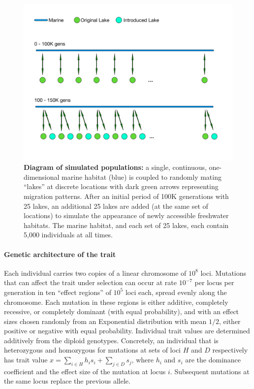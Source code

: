 \documentclass{article}
\begin{document}
\begin{figure}
	\begin{center}
  		\includegraphics[width=0.6\linewidth]{GeographyFigure.pdf}
  		\caption{
            \textbf{Diagram of simulated populations:}
            a single, continuous, one-dimensional marine habitat (blue)
            is coupled to randomly mating ``lakes'' at discrete locations with dark green arrows representing migration patterns.
            After an initial period of 100K generations with 25 lakes,
            an additional 25 lakes are added (at the same set of locations)
            to simulate the appearance of newly accessible freshwater habitats.
            The marine habitat, and each set of 25 lakes, each contain 5,000 individuals at all times.
			}
  		\label{fig:Geo}
	\end{center}
\end{figure}


\paragraph{Genetic architecture of the trait}
Each individual carries two copies of a linear chromosome of $10^8$ loci.
Mutations that can affect the trait under selection can occur at rate $10^{-7}$ per locus per generation
in ten ``effect regions'' of $10^5$ loci each,
spread evenly along the chromosome.
Each mutation in these regions is either additive, completely recessive, or completely dominant (with equal probability), 
and with an effect sizes chosen randomly from an Exponential distribution with mean $1/2$, either positive or negative with equal probability. 
Individual trait values are determined additively from the diploid genotypes. 
Concretely, an individual that is heterozygous and homozygous for mutations at sets of loci $H$ and $D$ respectively has trait value 
$x = \sum_{i \in H} h_i s_i + \sum_{j \in D} s_j$, 
where $h_i$ and $s_i$ are the dominance coefficient and the effect size of the mutation at locus $i$.
Subsequent mutations at the same locus replace the previous allele.
\end{document}
